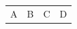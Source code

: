 \begin{enumerate}[noitemsep, label=\textbf{\arabic*}. ]
    
    \setlength\mytablespace{8\tabcolsep}
    \addtolength\mytablespace{5\arrayrulewidth}
    \setlength\mytablewidth{\linewidth}
        
    
    \setlength\mytableroom{\mytablewidth}
    \addtolength\mytableroom{-\mytablespace}
    
    \setlength\myfixedwidth{0pt}
    \setlength\mystarwidth{\mytableroom}
        \addtolength\mystarwidth{-\myfixedwidth}
        \divide{}
        
    
            
    
        \begin{center}
      
      \label{m38819*id197078}
      
    \noindent
      \tablelasttail{}
      \begin{xtabular*}{\mytablewidth}[t]{|p{10\mystarwidth}|p{10\mystarwidth}|p{10\mystarwidth}|p{10\mystarwidth}|}\hline
    
    
        A &
    
    
        B &
    
    
        C &
    
    
        D%
     \tabularnewline{}
    

\end{xtabular*}
\end{center}
\end{enumerate}
